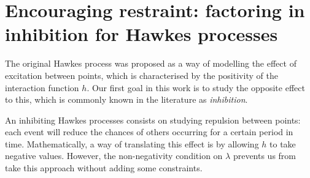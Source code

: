 
\section{Encouraging restraint: factoring in inhibition for Hawkes processes}\label{sec:chap0_inhibition}
    
    The original Hawkes process was proposed as a way of modelling the effect of excitation between points, which is characterised by the positivity of the interaction function $h$.
    Our first goal in this work is to study the opposite effect to this, which is commonly known in the literature as \emph{inhibition}.
    
    An inhibiting Hawkes processes consists on studying repulsion between points: each event will reduce the chances of others occurring for a certain period in time.
    Mathematically, a way of translating this effect is by allowing $h$ to take negative values. However, the non-negativity condition on $\lambda$ prevents us from take this approach without adding some constraints.

